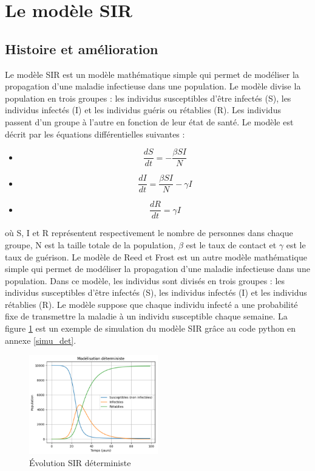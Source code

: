 \section{Le modèle SIR}
        \subsection{Histoire et amélioration}

Le modèle SIR est un modèle mathématique simple qui permet de modéliser la propagation d'une maladie infectieuse dans une population. Le modèle divise la population en trois groupes : les individus susceptibles d'être infectés (S), les individus infectés (I) et les individus guéris ou rétablies (R). Les individus passent d'un groupe à l'autre en fonction de leur état de santé. Le modèle est décrit par les équations différentielles suivantes :
	\begin{itemize}[label=$\bullet$]
	\item $$\displaystyle \frac{dS}{dt} = -\frac{\beta SI}{N}$$
	\end{itemize}
	
	\begin{itemize}[label=$\bullet$]
	\item $$\displaystyle \frac{dI}{dt} = \frac{\beta SI}{N} - \gamma I$$
	\end{itemize}
	
	\begin{itemize}[label=$\bullet$]
	\item $$\displaystyle \frac{dR}{dt} = \gamma I$$
	\end{itemize}
où S, I et R représentent respectivement le nombre de personnes dans chaque groupe, N est la taille totale de la population, $\beta$ est le taux de contact et $\gamma$ est le taux de guérison. Le modèle de Reed et Frost est un autre modèle mathématique simple qui permet de modéliser la propagation d'une maladie infectieuse dans une population. Dans ce modèle, les individus sont divisés en trois groupes : les individus susceptibles d'être infectés (S), les individus infectés (I) et les individus rétablies (R). Le modèle suppose que chaque individu infecté a une probabilité fixe de transmettre la maladie à un individu susceptible chaque semaine.
La figure \ref{fig:sir_deterministe} est un exemple de simulation du modèle SIR grâce au code python en annexe \ref{simu_det}.
	\begin{figure}[h]
    \centering
	\includegraphics[width=0.5\textwidth]{figs/sir_deterministe.png}
    \caption{Évolution SIR déterministe}
    \label{fig:sir_deterministe}
	\end{figure}
	
